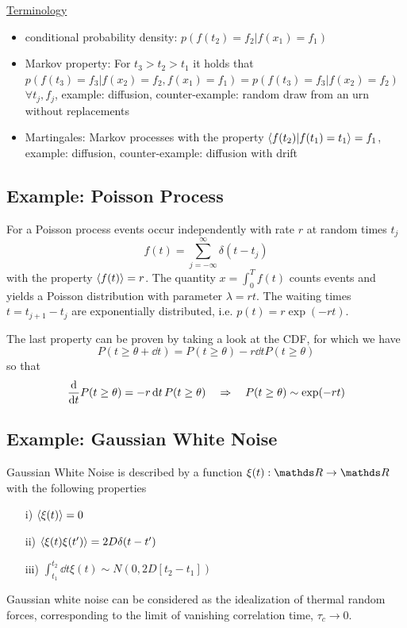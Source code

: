 \documentclass{/home/ben/Templates/notebook}
\begin{document}
	\underline{Terminology}
	
	\begin{itemize}
		\item{conditional probability density: $p(f(t_2) = f_2 | f(x_1) = f_1)$}
		\item{Markov property: For $t_3 > t_2 > t_1$ it holds that $p(f(t_3) = f_3 | f(x_2) = f_2, f(x_1)=f_1) = p(f(t_3) = f_3 | f(x_2) = f_2)$ $\forall t_j, f_j$, example: diffusion, counter-example: random draw from an urn without replacements}
		\item{Martingales: Markov processes with the property $\expval{f(t_2) | f(t_1) = t_1} = f_1$, example: diffusion, counter-example: diffusion with drift}
	\end{itemize}
	
	\subsection*{Example: Poisson Process}
	\begin{theorem}
		For a Poisson process events occur independently with rate $r$ at random times $t_j$
		\begin{equation}
		f(t) = \sum_{j = -\infty}^{\infty}{\delta(t-t_j)}
		\end{equation}
		with the property $\expval{f(t)} = r$. The quantity $x = \int_0^T f(t) $ counts events and yields a Poisson distribution with parameter $\lambda = rt$. The waiting times $t = t_{j+1} - t_j$ are exponentially distributed, i.e. $p(t) = r \exp(-rt)$. 
	\end{theorem}
	The last property can be proven by taking a look at the CDF, for which we have 
	\begin{equation*}
		P(t \geq \theta + \dd{t}) = P(t \geq \theta) - r \dd{t} P(t \geq \theta)
	\end{equation*}
	so that
	\begin{equation*}
		\dv{t} P(t \geq \theta) = - r \dd{t} P(t \geq \theta)  \quad \Rightarrow \quad P(t \geq \theta) \sim \exp(-r t)
	\end{equation*}
	
	
	\subsection*{Example: Gaussian White Noise}
	
	\begin{theorem}
		Gaussian White Noise is described by a function $\xi(t):\R \to \R$ with the following properties
		\begin{itemize}
			\item[i)]{$\expval{\xi(t)} = 0$}
			\item[ii)]{$\expval{\xi(t) \xi(t')} = 2D \delta(t-t')$}
			\item[iii)]{$\int_{t_1}^{t_2} \dd{t} \xi(t) \sim N(0,2D[t_2-t_1])$}
		\end{itemize}
		Gaussian white noise can be considered as the idealization of thermal random forces, corresponding to the limit of vanishing correlation time, $\tau_c \to 0$.
	\end{theorem}
	
\end{document}
